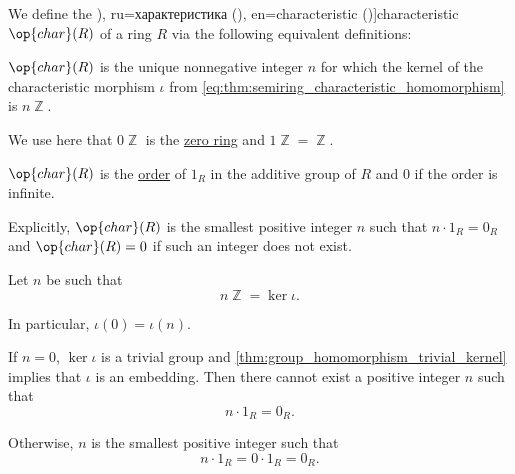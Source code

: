 \begin{definition}\label{def:ring_characteristic}
  We define the \term[bg=характеристика (\cite[396]{Обрешков1962ВисшаАлгебра}), ru=характеристика (\cite[32]{Винберг2014КурсАлгебры}), en=characteristic (\cite[148]{Knapp2016BasicAlgebra})]{characteristic} \( \op{char}(R) \) of a ring \( R \) via the following equivalent definitions:
  \begin{thmenum}
    \mimprovised \( \op{char}(R) \) is the unique nonnegative integer \( n \) for which the kernel of the characteristic morphism \( \iota \) from \eqref{eq:thm:semiring_characteristic_homomorphism} is \( n\BbbZ \).

    We use here that \( 0\BbbZ \) is the \hyperref[def:ring/trivial]{zero ring} and \( 1\BbbZ = \BbbZ \).

     \( \op{char}(R) \) is the \hyperref[def:group_order]{order} of \( 1_R \) in the additive group of \( R \) and \( 0 \) if the order is infinite.

    Explicitly, \( \op{char}(R) \) is the smallest positive integer \( n \) such that \( n \cdot 1_R = 0_R \) and \( \op{char}(R) = 0 \) if such an integer does not exist.
  \end{thmenum}
\end{definition}
\begin{defproof}
   Let \( n \) be such that
  \begin{equation*}
    n \BbbZ = \ker\iota.
  \end{equation*}

  In particular, \( \iota(0) = \iota(n) \).

  If \( n = 0 \), \( \ker\iota \) is a trivial group and \cref{thm:group_homomorphism_trivial_kernel} implies that \( \iota \) is an embedding. Then there cannot exist a positive integer \( n \) such that
  \begin{equation*}
    n \cdot 1_R = 0_R.
  \end{equation*}

  Otherwise, \( n \) is the smallest positive integer such that
  \begin{equation*}
    n \cdot 1_R = 0 \cdot 1_R = 0_R.
  \end{equation*}
\end{defproof}

